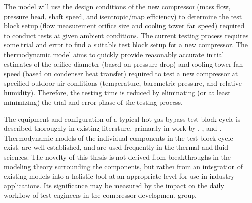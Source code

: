 The model will use the design conditions of the new compressor 
(mass flow, pressure head, shaft speed, and isentropic/map efficiency) 
to determine the test block setup 
(flow measurement orifice size and cooling tower fan speed) 
required to conduct tests at given ambient conditions. 
The current testing process requires some trial and error 
to find a suitable test block setup for a new compressor. 
The thermodynamic model aims to quickly provide reasonably accurate 
initial estimates of the orifice diameter (based on pressure drop) 
and cooling tower fan speed (based on condenser heat transfer) 
required to test a new compressor at specified outdoor air conditions
(temperature, barometric pressure, and relative humidity). 
Therefore, the testing time is reduced by eliminating (or at least minimizing) 
the trial and error phase of the testing process.

The equipment and configuration of a typical hot gas bypass test block
cycle is described thoroughly in existing literature, primarily in work by
\citet{mcgovern1984}, \citet{dirlea1996}, and \citet{sahs1956}.
Thermodynamic models of the individual components in the test block cycle exist, 
are well-established, and are used frequently in the thermal and fluid sciences.
The novelty of this thesis is not derived from breakthroughs in the modeling theory
surrounding the components, but rather from an integration of existing models
into a holistic tool at an appropriate level 
for use in industry applications.
Its significance may be measured by the impact on the daily workflow
of test engineers in the compressor development group.

